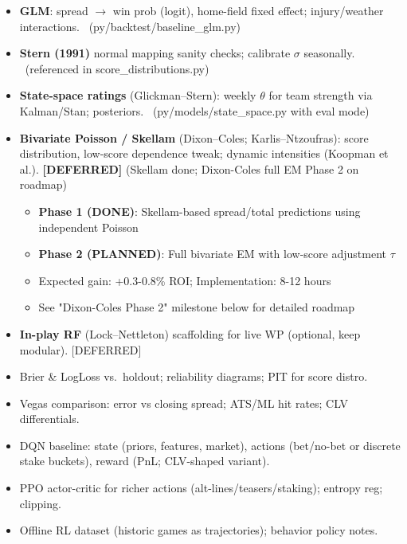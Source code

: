 \begin{itemize}
  \item {} \textbf{GLM}: spread $\to$ win prob (logit), home-field fixed effect; injury/weather interactions. \done\ (py/backtest/baseline\_glm.py)
  \item {} \textbf{Stern (1991)} normal mapping sanity checks; calibrate $\sigma$ seasonally. \done\ (referenced in score\_distributions.py)
  \item {} \textbf{State-space ratings} (Glickman--Stern): weekly $\theta$ for team strength via Kalman/Stan; posteriors. \done\ (py/models/state\_space.py with eval mode)
  \item {} \textbf{Bivariate Poisson / Skellam} (Dixon--Coles; Karlis--Ntzoufras): score distribution, low-score dependence tweak; dynamic intensities (Koopman et al.). \textbf{[DEFERRED]} (Skellam done; Dixon-Coles full EM Phase 2 on roadmap)
  \begin{itemize}
    \item \textbf{Phase 1 (DONE)}: Skellam-based spread/total predictions using independent Poisson
    \item \textbf{Phase 2 (PLANNED)}: Full bivariate EM with low-score adjustment $\tau$
    \item Expected gain: +0.3-0.8\% ROI; Implementation: 8-12 hours
    \item See "Dixon-Coles Phase 2" milestone below for detailed roadmap
  \end{itemize}
  \item {} \textbf{In-play RF} (Lock--Nettleton) scaffolding for live WP (optional, keep modular). [DEFERRED]
\end{itemize}

\begin{itemize}
  \item {} Brier \& LogLoss vs.\ holdout; reliability diagrams; PIT for score distro.
  \item {} Vegas comparison: error vs closing spread; ATS/ML hit rates; CLV differentials.
\end{itemize}

\begin{itemize}
  \item {} DQN baseline: state (priors, features, market), actions (bet/no-bet or discrete stake buckets), reward (PnL; CLV-shaped variant).
  \item {} PPO actor-critic for richer actions (alt-lines/teasers/staking); entropy reg; clipping.
  \item {} Offline RL dataset (historic games as trajectories); behavior policy notes.
\end{itemize}

